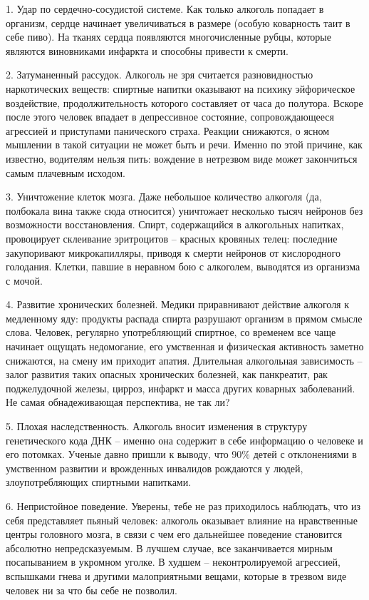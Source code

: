 1. Удар по сердечно-сосудистой системе. Как только алкоголь попадает в организм, сердце начинает увеличиваться в размере (особую коварность таит в себе пиво). На тканях сердца появляются многочисленные рубцы, которые являются виновниками инфаркта и способны привести к смерти.

2. Затуманенный рассудок. Алкоголь не зря считается разновидностью наркотических веществ: спиртные напитки оказывают на психику эйфорическое воздействие, продолжительность которого составляет от часа до полутора. Вскоре после этого человек впадает в депрессивное состояние, сопровождающееся агрессией и приступами панического страха. Реакции снижаются, о ясном мышлении в такой ситуации не может быть и речи. Именно по этой причине, как известно, водителям нельзя пить: вождение в нетрезвом виде может закончиться самым плачевным исходом.

3. Уничтожение клеток мозга. Даже небольшое количество алкоголя (да, полбокала вина также сюда относится) уничтожает несколько тысяч нейронов без возможности восстановления. Спирт, содержащийся в алкогольных напитках, провоцирует склеивание эритроцитов – красных кровяных телец: последние закупоривают микрокапилляры, приводя к смерти нейронов от кислородного голодания. Клетки, павшие в неравном бою с алкоголем, выводятся из организма с мочой.

4. Развитие хронических болезней. Медики приравнивают действие алкоголя к медленному яду: продукты распада спирта разрушают организм в прямом смысле слова. Человек, регулярно употребляющий спиртное, со временем все чаще начинает ощущать недомогание, его умственная и физическая активность заметно снижаются, на смену им приходит апатия. Длительная алкогольная зависимость – залог развития таких опасных хронических болезней, как панкреатит, рак поджелудочной железы, цирроз, инфаркт и масса других коварных заболеваний. Не самая обнадеживающая перспектива, не так ли?

5. Плохая наследственность. Алкоголь вносит изменения в структуру генетического кода ДНК – именно она содержит в себе информацию о человеке и его потомках. Ученые давно пришли к выводу, что 90\% детей с отклонениями в умственном развитии и врожденных инвалидов рождаются у людей, злоупотребляющих спиртными напитками.

6. Непристойное поведение. Уверены, тебе не раз приходилось наблюдать, что из себя представляет пьяный человек: алкоголь оказывает влияние на нравственные центры головного мозга, в связи с чем его дальнейшее поведение становится абсолютно непредсказуемым. В лучшем случае, все заканчивается мирным посапыванием в укромном уголке. В худшем – неконтролируемой агрессией, вспышками гнева и другими малоприятными вещами, которые в трезвом виде человек ни за что бы себе не позволил.

